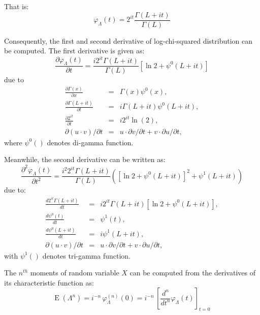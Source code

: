 \documentclass[journal]{IEEEtran}
\begin{document}
That is:
\begin{equation}
\varphi_\Lambda(t) = 2^{it} \frac{\Gamma(L+it)}{\Gamma(L)}  
\end{equation}

Consequently, the first and second derivative of log-chi-squared distribution can be computed.
The first derivative is given as:
\begin{equation}
  \frac{\partial \varphi_\Lambda(t)}{\partial t} = \frac{i 2^{it} \Gamma(L+it)}{\Gamma(L)} \left[ \ln{2} + \psi^0(L+it) \right]
\end{equation}
due to
\begin{eqnarray*}
  \frac{\partial \Gamma(x)}{\partial x} &=& \Gamma(x)\psi^0(x), \\
  \frac{\partial \Gamma(L+it)}{\partial t} &=& i\Gamma(L+it)\psi^0(L+it), \\
  \frac{\partial 2^{it}}{\partial t} &=& i2^{it}\ln(2), \\
  \partial (u \cdot v) / \partial t &=& u \cdot \partial v /\partial t + v \cdot \partial u/\partial t, 
\end{eqnarray*}
where $\psi^0()$ denotes di-gamma function.

Meanwhile, the second derivative can be written as:
\begin{equation}
  \frac{\partial ^2 \varphi_\Lambda(t)}{\partial t^2} = \frac{i^2 2^{it} \Gamma(L+it)}{\Gamma(L)} \left( \left[ \ln{2} + \psi^0(L+it) \right] ^ 2 + \psi^1(L+it) \right)
\end{equation}
due to:
\begin{eqnarray*}
  \frac{d 2^{it} \Gamma(L+it)}{dt} &=& i 2^{it} \Gamma(L+it) \left[ \ln{2} + \psi^0(L+it) \right], \\
  \frac{d \psi^0(t)}{dt} &=& \psi^1(t), \\
  \frac{d \psi^0(L+it)}{dt} &=& i \psi^1(L+it), \\
  \partial (u \cdot v) / \partial t &=& u \cdot \partial v /\partial t + v \cdot \partial u/\partial t,
\end{eqnarray*}
with $\psi^1()$ denotes tri-gamma function.

The $n^{th}$ moments of random variable $X$ can be computed from the derivatives of its characteristic function as:
\begin{equation}
\operatorname{E}\left(\Lambda^n\right) = i^{-n}\, \varphi_\Lambda^{(n)}(0)
  = i^{-n}\, \left[\frac{d^n}{dt^n} \varphi_\Lambda(t)\right]_{t=0} \,\!
\end{equation}
\end{document}
